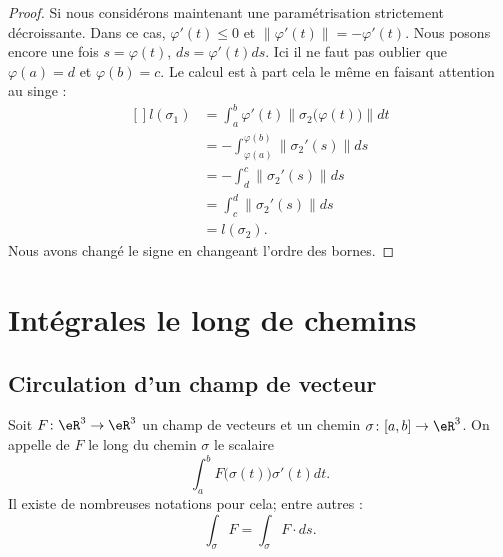 \begin{proof}
    Si nous considérons maintenant une paramétrisation strictement décroissante. Dans ce cas, $\varphi'(t)\leq 0$ et $\| \varphi'(t) \|=-\varphi'(t)$. Nous posons encore une fois $s=\varphi(t)$, $ds=\varphi'(t)ds$. Ici il ne faut pas oublier que $\varphi(a)=d$ et $\varphi(b)=c$. Le calcul est à part cela le même en faisant attention au singe :
    \begin{equation}
        \begin{aligned}[]
            l(\sigma_1)&=\int_a^b\varphi'(t)\| \sigma_2\big( \varphi(t) \big) \|dt\\
            &=-\int_{\varphi(a)}^{\varphi(b)}\| \sigma_2'(s) \|ds\\
            &=-\int_d^c\| \sigma_2'(s) \|ds\\
            &=\int_c^d\| \sigma_2'(s) \|ds\\
            &=l(\sigma_2).
        \end{aligned}
    \end{equation}
    Nous avons changé le signe en changeant l'ordre des bornes.
\end{proof}

\section{Intégrales le long de chemins}

\subsection{Circulation d'un champ de vecteur}

\begin{definition}
    Soit $F\colon \eR^3\to \eR^3$ un champ de vecteurs et un chemin $\sigma\colon \mathopen[ a , b \mathclose]\to \eR^3$. On appelle  de $F$ le long du chemin $\sigma$ le scalaire
    \begin{equation}
        \int_a^b F\big( \sigma(t) \big)\sigma'(t)dt.
    \end{equation}
    Il existe de nombreuses notations pour cela; entre autres :
    \begin{equation}
        \int_{\sigma}F=\int_{\sigma} F\cdot ds.
    \end{equation}
\end{definition}

